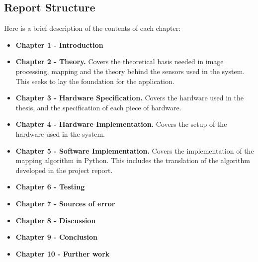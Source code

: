\newpage

\subsection{Report Structure}
Here is a brief description of the contents of each chapter:

\begin{itemize}
\item \textbf{Chapter 1 - Introduction}
\item \textbf{Chapter 2 - Theory.} Covers the theoretical basis needed in image processing, mapping and the theory behind the sensors used in the system. This seeks to lay the foundation for the application.
\item \textbf{Chapter 3 - Hardware Specification.} Covers the hardware used in the thesis, and the specification of each piece of hardware. 
\item \textbf{Chapter 4 - Hardware Implementation.} Covers the setup of the hardware used in the system. 
\item \textbf{Chapter 5 - Software Implementation.} Covers the implementation of the mapping algorithm in Python. This includes the translation of the algorithm developed in the project report\cite{kris}. %
\item \textbf{Chapter 6 - Testing}
\item \textbf{Chapter 7 - Sources of error}
\item \textbf{Chapter 8 - Discussion}
\item \textbf{Chapter 9 - Conclusion}
\item \textbf{Chapter 10 - Further work}
\end{itemize}


